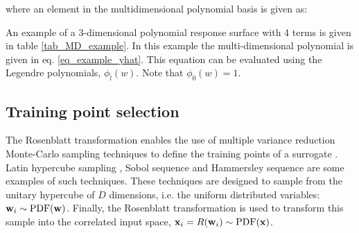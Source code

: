 \documentclass[preprint,12pt]{elsarticle}
\begin{document}

\noindent where an element in the multidimensional polynomial basis is given as:


An example of a 3-dimensional polynomial response surface with 4 terms is given in table \ref{tab_MD_example}. In this example the multi-dimensional polynomial is given in eq. \ref{eq_example_yhat}. This equation can be evaluated using the Legendre polynomials, $\phi_{l}(w)$. Note that $\phi_{0}(w)=1$.

\begin{table}[h!]
\begin{centering}
\caption{Example of the notation of a 3-dimensional polynomial response surface.}
\label{tab_MD_example}
\end{centering}
\end{table}%


\subsection{Training point selection}

The Rosenblatt transformation enables the use of multiple variance reduction Monte-Carlo sampling techniques to define the training points of a surrogate \cite{feinberg2015chaospy}. Latin hypercube sampling \cite{mckay2000comparison}, Sobol sequence \cite{sobol1967distribution} and Hammersley sequence \cite{hammersley1960monte} are some examples of such techniques. These techniques are designed to sample from the unitary hypercube of $D$ dimensions, i.e. the uniform distributed variables: $\mathbf{w}_i \sim \mathrm{PDF}(\mathbf{w})$. Finally, the Rosenblatt transformation is used to transform this sample into the correlated input space, $\mathbf{x}_i = R(\mathbf{w}_i) \sim \mathrm{PDF}(\mathbf{x})$.
\end{document}
